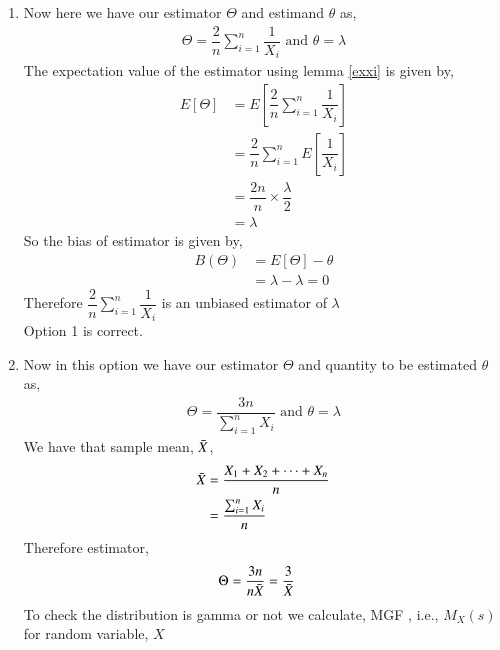 \documentclass[journal,12pt,twocolumn]{IEEEtran}
\theoremstyle{definition}
\begin{document}
\begin{enumerate}
    \item 
  Now here we have our estimator $ \Theta$ and estimand $ \theta $ as,
 \begin{align}
     \Theta = \dfrac{2}{n} \sum_{i=1}^{n} \dfrac{1}{X_i} \text{  and  }
     \theta = \lambda
 \end{align}
The expectation value of the estimator using lemma \ref{exxi} is given by, 
\begin{align}
    E[\Theta ] &= E  \left[   \dfrac{2}{n} \sum_{i=1}^{n} \dfrac{1}{X_i}  \right] \\
    & = \dfrac{2}{n} \sum_{i=1}^{n} E  \left[ \dfrac{1}{X_i}  \right] \\
    &= \dfrac{2n}{n} \times \dfrac{\lambda}{2} \\
    &= \lambda
\end{align}
So the bias of estimator is given by,
\begin{align}
    B(\Theta) &= E[\Theta] - \theta  \\
    &= \lambda - \lambda = 0
\end{align}
Therefore $\dfrac{2}{n} \sum_{i=1}^{n} \dfrac{1}{X_i} $ is an unbiased estimator of $ \lambda$ \\
Option 1 is correct. \\
\item
 Now in this option we have our estimator $ \Theta$ and quantity to be estimated $ \theta $ as,
 \begin{align}
     \Theta = \dfrac{3n}{\sum_{i=1}^{n} X_i } \text{  and  }
     \theta = \lambda
 \end{align}
We have that sample mean, $ \Bar{X}$,
\begin{align}
    \Bar{X} &= \dfrac{X_1+X_2+ \cdots +X_n}{n} \\
    & = \dfrac{\sum_{i=1}^{n} X_i}{n}
\end{align}
Therefore estimator,
\begin{align}
    \Theta &= \dfrac{3n}{n \Bar{X}} 
    = \dfrac{3}{ \Bar{X}} 
    \label{xbar}
\end{align}
To check the distribution is gamma or not we calculate, MGF , i.e., $ M_X(s) $ for random variable, $ X $


\end{enumerate}
\end{document}
